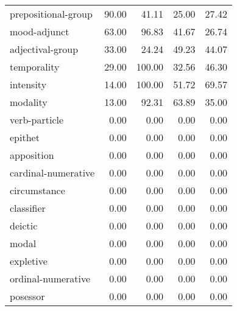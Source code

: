 \begin{table}[!ht]
\begin{tabular}{lrrrr}
prepositional-group       &    90.00 &                       41.11 &                   25.00 &                   27.42 \\
mood-adjunct              &    63.00 &                       96.83 &                   41.67 &                   26.74 \\
adjectival-group          &    33.00 &                       24.24 &                   49.23 &                   44.07 \\
temporality               &    29.00 &                      100.00 &                   32.56 &                   46.30 \\
intensity                 &    14.00 &                      100.00 &                   51.72 &                   69.57 \\
modality                  &    13.00 &                       92.31 &                   63.89 &                   35.00 \\
verb-particle             &     0.00 &                        0.00 &                    0.00 &                    0.00 \\
epithet                   &     0.00 &                        0.00 &                    0.00 &                    0.00 \\
apposition                &     0.00 &                        0.00 &                    0.00 &                    0.00 \\
cardinal-numerative       &     0.00 &                        0.00 &                    0.00 &                    0.00 \\
circumstance              &     0.00 &                        0.00 &                    0.00 &                    0.00 \\
classifier                &     0.00 &                        0.00 &                    0.00 &                    0.00 \\
deictic                   &     0.00 &                        0.00 &                    0.00 &                    0.00 \\
modal                     &     0.00 &                        0.00 &                    0.00 &                    0.00 \\
expletive                 &     0.00 &                        0.00 &                    0.00 &                    0.00 \\
ordinal-numerative        &     0.00 &                        0.00 &                    0.00 &                    0.00 \\
posessor                  &     0.00 &                        0.00 &                    0.00 &                    0.00 \\

\end{tabular}
\end{table}
